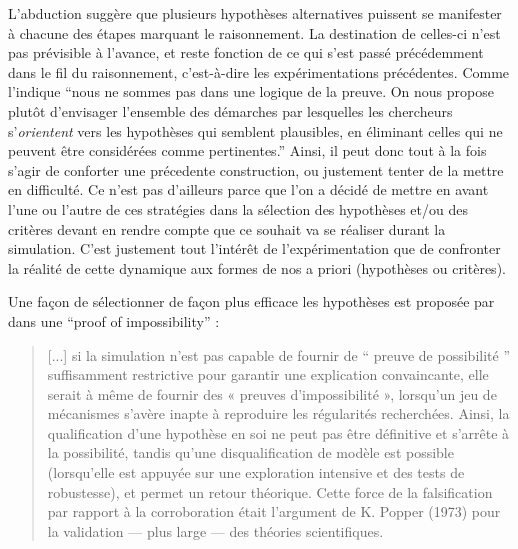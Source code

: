 


L'abduction suggère que plusieurs hypothèses alternatives puissent se manifester à chacune des étapes marquant le raisonnement. La destination de celles-ci n'est pas prévisible à l'avance, et reste fonction de ce qui s'est passé précédemment dans le fil du raisonnement, c'est-à-dire les expérimentations précédentes. Comme l'indique \textcite{Besse2000} \enquote{nous ne sommes pas dans une logique de la preuve. On nous propose plutôt d'envisager l'ensemble des démarches par lesquelles les chercheurs s'\textit{orientent} vers les hypothèses qui semblent plausibles, en éliminant celles qui ne peuvent être considérées comme pertinentes.} Ainsi, il peut donc tout à la fois s'agir de conforter une précedente construction, ou justement tenter de la mettre en difficulté. Ce n'est pas d'ailleurs parce que l'on a décidé de mettre en avant l'une ou l'autre de ces stratégies dans la sélection des hypothèses et/ou des critères devant en rendre compte que ce souhait va se réaliser durant la simulation. C'est justement tout l'intérêt de l'expérimentation que de confronter la réalité de cette dynamique aux formes de nos a priori (hypothèses ou critères).

Une façon de sélectionner de façon plus efficace les hypothèses est proposée par \textcite[300]{Cottineau2014b} dans une \foreignquote{english}{proof of impossibility} :

\blockquote[{\cite[300]{Cottineau2014b}}]{[...] si la simulation n’est pas capable de fournir de \enquote{ preuve de possibilité } suffisamment restrictive pour garantir une explication convaincante, elle serait à même de fournir des « preuves d’impossibilité », lorsqu’un jeu de mécanismes s’avère inapte à reproduire les régularités recherchées. Ainsi, la qualification d’une hypothèse en soi ne peut pas être définitive et s’arrête à la possibilité, tandis qu’une disqualification de modèle est possible (lorsqu’elle est appuyée sur une exploration intensive et des tests de robustesse), et permet un retour théorique. Cette force de la falsification par rapport à la corroboration était l’argument de K. Popper (1973) pour la validation — plus large — des théories scientifiques.}

